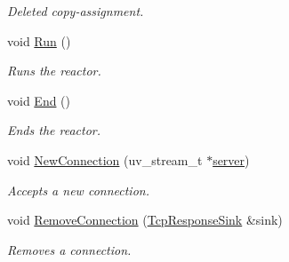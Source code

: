 \begin{DoxyCompactItemize}
\begin{DoxyCompactList}\small\item\em Deleted copy-\/assignment. \end{DoxyCompactList}\item 
void \hyperlink{classIoReactor_a23f583f9964a6f3f38f983b40f7ae10d}{Run} ()
\begin{DoxyCompactList}\small\item\em Runs the reactor. \end{DoxyCompactList}\item 
void \hyperlink{classIoReactor_a3566c7200adb102579d2c330a2cbf91d}{End} ()
\begin{DoxyCompactList}\small\item\em Ends the reactor. \end{DoxyCompactList}\item 
void \hyperlink{classIoReactor_a535c6ff0899391afc02c87b1dfe7c6e2}{New\+Connection} (uv\+\_\+stream\+\_\+t $\ast$\hyperlink{classIoReactor_a4c9c61af246fda7db1bdd4e2b3170c66}{server})
\begin{DoxyCompactList}\small\item\em Accepts a new connection. \end{DoxyCompactList}\item 
void \hyperlink{classIoReactor_af31bb722acf08d10eaa46ea7a1a5d4ca}{Remove\+Connection} (\hyperlink{classTcpResponseSink}{Tcp\+Response\+Sink} \&sink)
\begin{DoxyCompactList}\small\item\em Removes a connection. \end{DoxyCompactList}\end{DoxyCompactItemize}
